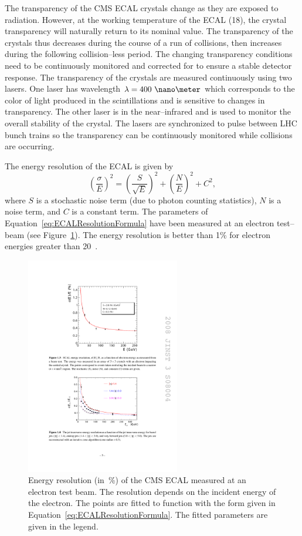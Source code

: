 The transparency of the CMS ECAL crystals change as they are exposed to
radiation.  However, at the working temperature of the ECAL (18\celsius), the
crystal transparency will naturally return to its nominal value.  The
transparency of the crystals thus decreases during the course of a run of
collisions, then increases during the following collision--less period.
The changing transparency conditions need to be continuously monitored and
corrected for to ensure a stable detector response.  The transparency of the
crystals are measured continuously using two lasers. One laser has wavelength
$\lambda = 400~\nano\meter$ which corresponds to the color of light produced in
the scintillations and is sensitive to changes in transparency.  The other laser
is in the near--infrared and is used to monitor the overall stability of the
crystal.  The lasers are synchronized to pulse between LHC bunch trains so the
transparency can be continuously monitored while collisions are occurring.

The energy resolution of the ECAL is given by
\begin{equation}
  \left(\frac{\sigma}{E}\right)^2 = \left(\frac{S}{\sqrt E}\right)^2 + 
  \left(\frac{N}{E}\right)^2 + C^2,
  \label{eq:ECALResolutionFormula}
\end{equation}
where $S$ is a stochastic noise term (due to photon counting statistics), $N$ is
a noise term, and $C$ is a constant term.  The parameters of
Equation~\ref{eq:ECALResolutionFormula} have been measured at an electron
test--beam (see Figure~\ref{fig:ECALResolution}).  The energy resolution is
better than 1\% for electron energies greater than 20~\GeV.  
\begin{figure}
  \centering
  \includegraphics[width=0.6\textwidth]{detector_chapter/figures/ECAL_Energy_resolution.pdf}
  \caption[Energy resolution of the CMS ECAL]{Energy resolution (in~\%) of the
  CMS ECAL measured at an electron test beam.  The resolution depends on the
  incident energy of the electron.  The points are fitted to function with the
  form given in Equation~\ref{eq:ECALResolutionFormula}.  The fitted parameters
  are given in the legend.}
  \label{fig:ECALResolution}
\end{figure}

